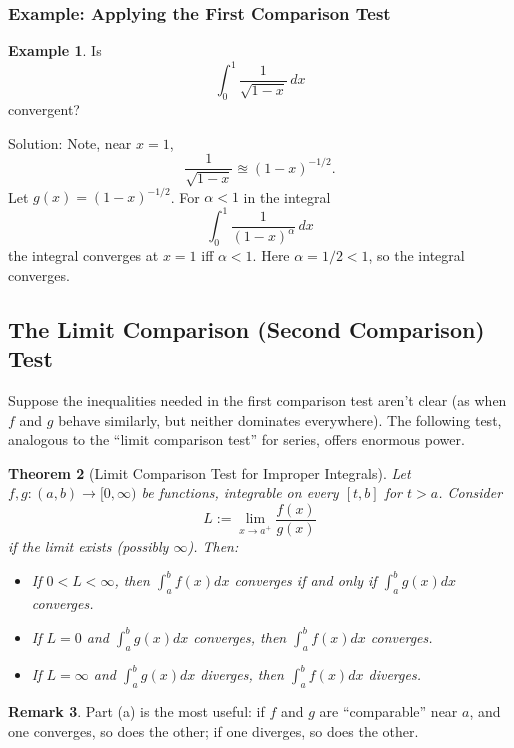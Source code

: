 \documentclass[12pt]{article}
\newtheorem{theorem}{Theorem}[section]
\theoremstyle{definition}
\newtheorem{example}[theorem]{Example}
\newtheorem{remark}[theorem]{Remark}
\begin{document}
\vspace{0.2cm}

\subsubsection*{Example: Applying the First Comparison Test}

\begin{example}
Is
\[
\int_0^1 \frac{1}{\sqrt{1 - x}}\, dx
\]
convergent?

Solution: Note, near $x = 1$,
\[
\frac{1}{\sqrt{1-x}} \approxeq (1 - x)^{-1/2}.
\]
Let $g(x) = (1 - x)^{-1/2}$. For $\alpha < 1$ in the integral
\[
\int_0^1 \frac{1}{(1-x)^\alpha}\, dx
\]
the integral converges at $x = 1$ iff $\alpha < 1$. Here $\alpha = 1/2 < 1$, so the integral converges.
\end{example}

\vspace{0.4cm}

\subsection{The Limit Comparison (Second Comparison) Test}

Suppose the inequalities needed in the first comparison test aren't clear (as when $f$ and $g$ behave similarly, but neither dominates everywhere). The following test, analogous to the ``limit comparison test'' for series, offers enormous power.

\begin{theorem}[Limit Comparison Test for Improper Integrals]
Let $f, g : (a, b) \to [0, \infty)$ be functions, integrable on every $[t, b]$ for $t > a$. Consider
\[
L := \lim_{x \to a^+} \frac{f(x)}{g(x)}
\]
if the limit exists (possibly $\infty$). Then:
\begin{itemize}
    \item[(a)] If $0 < L < \infty$, then $\displaystyle \int_a^b f(x) dx$ converges if and only if $\displaystyle \int_a^b g(x) dx$ converges.
    \item[(b)] If $L = 0$ and $\displaystyle \int_a^b g(x) dx$ converges, then $\displaystyle \int_a^b f(x) dx$ converges.
    \item[(c)] If $L = \infty$ and $\displaystyle \int_a^b g(x) dx$ diverges, then $\displaystyle \int_a^b f(x) dx$ diverges.
\end{itemize}
\end{theorem}

\begin{remark}
Part (a) is the most useful: if $f$ and $g$ are ``comparable'' near $a$, and one converges, so does the other; if one diverges, so does the other.
\end{remark}
\end{document}

